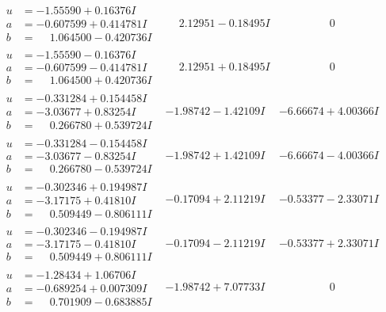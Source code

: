 \documentclass[1p]{elsarticle_modified}
\theoremstyle{definition}
\begin{document}
$$\begin{array}{c|c|c}
\begin{aligned}
u &= -1.55590 + 0.16376 I \\
a &= -0.607599 + 0.414781 I \\
b &= \phantom{-}1.064500 - 0.420736 I\end{aligned}
 & \phantom{-}2.12951 - 0.18495 I & \phantom{-0.000000 } 0 \\ \hline\begin{aligned}
u &= -1.55590 - 0.16376 I \\
a &= -0.607599 - 0.414781 I \\
b &= \phantom{-}1.064500 + 0.420736 I\end{aligned}
 & \phantom{-}2.12951 + 0.18495 I & \phantom{-0.000000 } 0 \\ \hline\begin{aligned}
u &= -0.331284 + 0.154458 I \\
a &= -3.03677 + 0.83254 I \\
b &= \phantom{-}0.266780 + 0.539724 I\end{aligned}
 & -1.98742 - 1.42109 I & -6.66674 + 4.00366 I \\ \hline\begin{aligned}
u &= -0.331284 - 0.154458 I \\
a &= -3.03677 - 0.83254 I \\
b &= \phantom{-}0.266780 - 0.539724 I\end{aligned}
 & -1.98742 + 1.42109 I & -6.66674 - 4.00366 I \\ \hline\begin{aligned}
u &= -0.302346 + 0.194987 I \\
a &= -3.17175 + 0.41810 I \\
b &= \phantom{-}0.509449 - 0.806111 I\end{aligned}
 & -0.17094 + 2.11219 I & -0.53377 - 2.33071 I \\ \hline\begin{aligned}
u &= -0.302346 - 0.194987 I \\
a &= -3.17175 - 0.41810 I \\
b &= \phantom{-}0.509449 + 0.806111 I\end{aligned}
 & -0.17094 - 2.11219 I & -0.53377 + 2.33071 I \\ \hline\begin{aligned}
u &= -1.28434 + 1.06706 I \\
a &= -0.689254 + 0.007309 I \\
b &= \phantom{-}0.701909 - 0.683885 I\end{aligned}
 & -1.98742 + 7.07733 I & \phantom{-0.000000 } 0 \\ \hline\begin{aligned}

\end{aligned}
\end{array}$$
\end{document}
